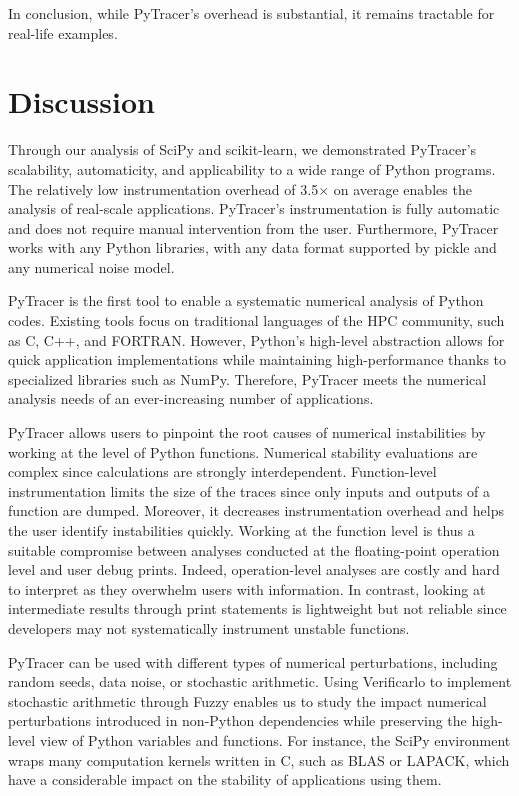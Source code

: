 \documentclass[10pt,journal,compsoc]{IEEEtran}
\newcommand{\pytracer}[0]{PyTracer\xspace}
\begin{document}
In conclusion, while \pytracer's overhead is substantial, it remains tractable
for real-life examples.

\section{Discussion}

Through our analysis of SciPy and scikit-learn, we demonstrated \pytracer's
scalability, automaticity, and applicability to a wide range of Python programs.
The relatively low instrumentation overhead of 3.5$\times$ on average enables
the analysis of real-scale applications. \pytracer's instrumentation is fully
automatic and does not require manual intervention from the user. Furthermore,
\pytracer works with any Python libraries, with any data format supported by
pickle and any numerical noise model.

\pytracer is the first tool to enable a systematic numerical analysis of Python
codes. Existing tools focus on traditional languages of the HPC community, such
as C, C++, and FORTRAN. However, Python's high-level abstraction allows for
quick application implementations while maintaining high-performance thanks to
specialized libraries such as NumPy. Therefore, \pytracer meets the numerical
analysis needs of an ever-increasing number of applications.

\pytracer allows users to pinpoint the root causes of numerical instabilities by
working at the level of Python functions. Numerical stability evaluations are
complex since calculations are strongly interdependent. Function-level
instrumentation limits the size of the traces since only inputs and outputs of a
function are dumped. Moreover, it decreases instrumentation overhead and helps
the user identify instabilities quickly. Working at the function level is thus a
suitable compromise between analyses conducted at the floating-point operation
level and user debug prints. Indeed, operation-level analyses are costly and
hard to interpret as they overwhelm users with information. In contrast, looking
at intermediate results through print statements is lightweight but not reliable
since developers may not systematically instrument unstable functions.

\pytracer can be used with different types of numerical perturbations, including
random seeds, data noise, or stochastic arithmetic. Using Verificarlo to
implement stochastic arithmetic through Fuzzy enables us to study the
impact numerical perturbations introduced in non-Python dependencies
while preserving the high-level view of Python variables and functions. For
instance, the SciPy environment wraps many computation kernels written in C,
such as BLAS or LAPACK, which have a considerable impact on the stability of
applications using them.
\end{document}
